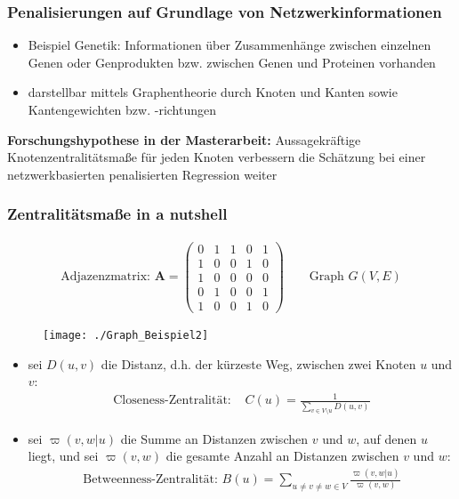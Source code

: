 \documentclass{beamer}
\begin{document}
\begin{frame}
\frametitle{Penalisierungen auf Grundlage von Netzwerkinformationen}
	\begin{itemize}
	\item  Beispiel Genetik: Informationen über Zusammenhänge zwischen einzelnen Genen oder Genprodukten bzw. zwischen Genen und Proteinen vorhanden
	\item darstellbar mittels Graphentheorie durch Knoten und Kanten sowie Kantengewichten bzw. -richtungen
	\end{itemize}
	\textbf{Forschungshypothese in der Masterarbeit:} Aussagekräftige Knotenzentralitätsmaße für jeden Knoten verbessern die Schätzung bei einer netzwerkbasierten penalisierten Regression weiter
\end{frame}


\begin{frame}
	\frametitle{Zentralitätsmaße {\glqq}in a nutshell{\grqq}}
	\begin{align*}
	\text{Adjazenzmatrix: } \mathbf{A}=\begin{pmatrix}
	0 & 1 & 1 & 0 & 1 \\
	1 & 0 & 0 & 1 & 0 \\
	1 & 0 & 0 & 0 & 0 \\
	0 & 1 & 0 & 0 & 1 \\
	1 & 0 & 0 & 1 & 0
	\end{pmatrix} \qquad \text{Graph }G(V,E)
	\end{align*}
	\begin{figure}
	\centering
	\texttt{[image: ./Graph\_Beispiel2]}
	\label{fig:graphentheorie}
	\end{figure}
\end{frame}


\begin{frame}
	\begin{itemize}
	\item sei $D(u, v)$ die Distanz, d.h. der kürzeste Weg, zwischen zwei Knoten $u$ und $v$: 
	\begin{align*}
	\text{Closeness-Zentralität: } & C(u)=\frac{1}{\sum_{v \in V \setminus u} D(u, v)}
	\end{align*}
	\item sei $\varpi(v,w|u)$ die Summe an Distanzen zwischen $v$ und $w$, auf denen $u$ liegt, und sei $\varpi(v,w)$ die gesamte Anzahl an Distanzen zwischen $v$ und $w$:
	\begin{align*}
		\text{Betweenness-Zentralität: } B(u)=\sum_{u \neq v \neq w \in V} \frac{\varpi(v,w|u)}{\varpi(v,w)}\\
	\end{align*}
	\end{itemize}
\end{frame}
\end{document}
